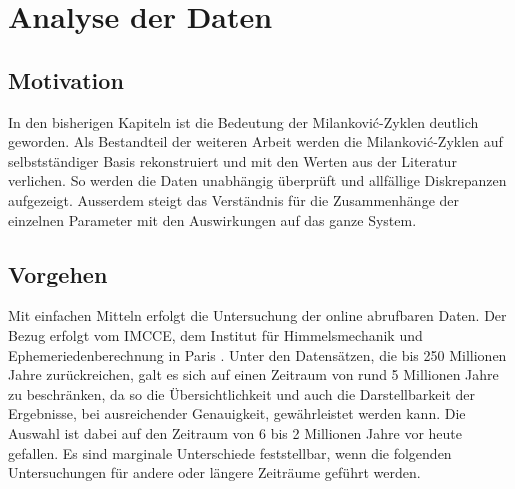%
%
%
%
\section{Analyse der Daten 
\label{milankovic:section:WissenschaftlicheArbeit}}

\subsection{Motivation
	\label{milankovic:subsection:Motivation}}
In den bisherigen Kapiteln ist die Bedeutung der Milankovi\'c-Zyklen deutlich geworden. Als Bestandteil der weiteren Arbeit werden die Milankovi\'c-Zyklen auf selbstständiger Basis rekonstruiert und mit den Werten aus der Literatur verlichen. So werden die Daten unabhängig überprüft und allfällige Diskrepanzen aufgezeigt. Ausserdem steigt das Verständnis für die Zusammenhänge der einzelnen Parameter mit den Auswirkungen auf das ganze System. 

\subsection{Vorgehen
\label{milankovic:subsection:Vorgehen}}
Mit einfachen Mitteln erfolgt die Untersuchung der online abrufbaren Daten.
Der Bezug erfolgt vom IMCCE, dem Institut für Himmelsmechanik und Ephemeriedenberechnung in Paris
%
\cite{milankovic:vo.imcce.fr}.
Unter den Datensätzen, die bis 250 Millionen Jahre zurückreichen, galt es sich auf einen Zeitraum von rund 5 Millionen Jahre zu beschränken, da so die Übersichtlichkeit und auch die Darstellbarkeit der Ergebnisse, bei ausreichender Genauigkeit, gewährleistet werden kann.
Die Auswahl ist dabei auf den Zeitraum von 6 bis 2 Millionen Jahre vor heute gefallen.
Es sind marginale Unterschiede feststellbar, wenn die folgenden Untersuchungen für andere oder längere Zeiträume geführt werden.

